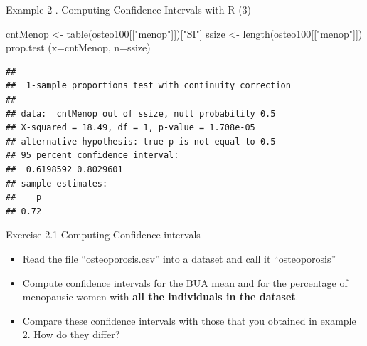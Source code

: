 \documentclass[
  ignorenonframetext,
]{beamer}
\newenvironment{Shaded}{\begin{snugshade}}{\end{snugshade}}
\newcommand{\AttributeTok}[1]{\textcolor[rgb]{0.77,0.63,0.00}{#1}}
\newcommand{\FunctionTok}[1]{\textcolor[rgb]{0.00,0.00,0.00}{#1}}
\newcommand{\NormalTok}[1]{#1}
\newcommand{\OtherTok}[1]{\textcolor[rgb]{0.56,0.35,0.01}{#1}}
\newcommand{\StringTok}[1]{\textcolor[rgb]{0.31,0.60,0.02}{#1}}
\begin{document}
\begin{frame}[fragile]
\begin{block}{Example 2 . Computing Confidence Intervals with R (3)}
\protect\hypertarget{example-2-.-computing-confidence-intervals-with-r-3}{}
\begin{Shaded}
\begin{Highlighting}[]
\NormalTok{cntMenop }\OtherTok{\textless{}{-}} \FunctionTok{table}\NormalTok{(osteo100[[}\StringTok{"menop"}\NormalTok{]])[}\StringTok{"SI"}\NormalTok{]}
\NormalTok{ssize }\OtherTok{\textless{}{-}} \FunctionTok{length}\NormalTok{(osteo100[[}\StringTok{"menop"}\NormalTok{]])}
\FunctionTok{prop.test}\NormalTok{ (}\AttributeTok{x=}\NormalTok{cntMenop, }\AttributeTok{n=}\NormalTok{ssize)}
\end{Highlighting}
\end{Shaded}

\begin{verbatim}
## 
##  1-sample proportions test with continuity correction
## 
## data:  cntMenop out of ssize, null probability 0.5
## X-squared = 18.49, df = 1, p-value = 1.708e-05
## alternative hypothesis: true p is not equal to 0.5
## 95 percent confidence interval:
##  0.6198592 0.8029601
## sample estimates:
##    p 
## 0.72
\end{verbatim}
\end{block}
\end{frame}

\begin{frame}{Exercise 2.1 Computing Confidence intervals}
\protect\hypertarget{exercise-2.1-computing-confidence-intervals}{}
\begin{itemize}
\item
  Read the file ``osteoporosis.csv'' into a dataset and call it
  ``osteoporosis''
\item
  Compute confidence intervals for the BUA mean and for the percentage
  of menopausic women with \textbf{all the individuals in the dataset}.
\item
  Compare these confidence intervals with those that you obtained in
  example 2. How do they differ?
\end{itemize}
\end{frame}
\end{document}
